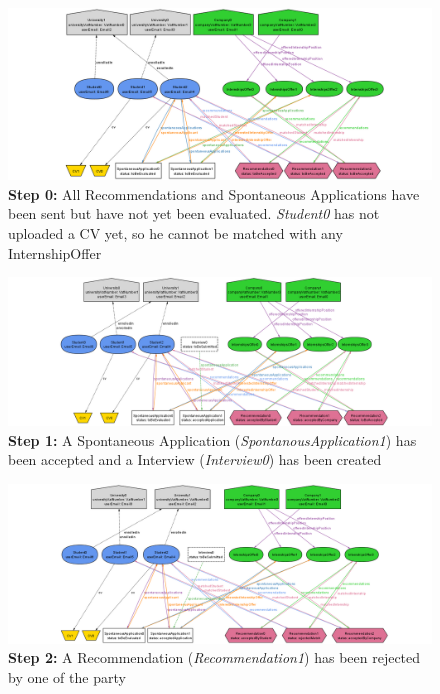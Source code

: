 \begin{figure}[H]
    \hspace{-2.5cm}
    \includegraphics[width=1.3\linewidth]{Latex/Images/Alloy/0.png}
    \caption*{\textbf{Step 0:} All Recommendations and Spontaneous Applications have been sent but have not yet been evaluated. \textit{Student0} has not uploaded a CV yet, so he cannot be matched with any InternshipOffer}
    \label{fig:ALIMG0}
\end{figure}
\begin{figure}[H]
    \hspace{-2.5cm}
    \includegraphics[width=1.3\linewidth]{Latex/Images/Alloy/1.png}
    \caption*{\textbf{Step 1:} A Spontaneous Application (\textit{SpontanousApplication1}) has been accepted and a Interview  (\textit{Interview0}) has been created}
    \label{fig:ALIMG1}
\end{figure}
\begin{figure}[H]
    \hspace{-2.5cm}
    \includegraphics[width=1.3\linewidth]{Latex/Images/Alloy/2.png}
    \caption*{\textbf{Step 2:} A Recommendation (\textit{Recommendation1}) has been rejected by one of the party}
    \label{fig:ALIMG2}
\end{figure}
